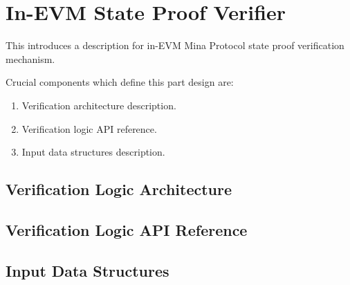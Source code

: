 \chapter{In-EVM State Proof Verifier}

This introduces a description for in-EVM Mina Protocol state proof verification 
mechanism.

Crucial components which define this part design are:
\begin{enumerate}
    \item Verification architecture description.
    \item Verification logic API reference.
    \item Input data structures description.
\end{enumerate}

\section{Verification Logic Architecture}

\section{Verification Logic API Reference}

\section{Input Data Structures}


